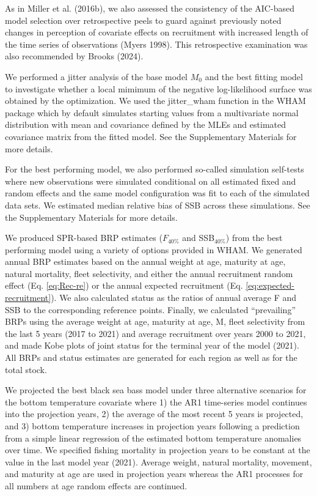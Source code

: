 \documentclass[
]{article}
\begin{document}
As in Miller et al. (2016b), we also assessed the consistency of the
AIC-based model selection over retrospective peels to guard against
previously noted changes in perception of covariate effects on
recruitment with increased length of the time series of observations
(Myers 1998). This retrospective examination was also recommended by
Brooks (2024).

We performed a jitter analysis of the base model \(M_0\) and the best
fitting model to investigate whether a local mimimum of the negative
log-likelihood surface was obtained by the optimization. We used the
jitter\_wham function in the WHAM package which by default simulates
starting values from a multivariate normal distribution with mean and
covariance defined by the MLEs and estimated covariance matrix from the
fitted model. See the Supplementary Materials for more details.

For the best performing model, we also performed so-called simulation
self-tests where new observations were simulated conditional on all
estimated fixed and random effects and the same model configuration was
fit to each of the simulated data sets. We estimated median relative
bias of SSB across these simulations. See the Supplementary Materials
for more details.

We produced SPR-based BRP estimates (\(F_{40\%}\) and SSB\(_{40\%}\))
from the best performing model using a variety of options provided in
WHAM. We generated annual BRP estimates based on the annual weight at
age, maturity at age, natural mortality, fleet selectivity, and either
the annual recruitment random effect (Eq. \ref{eq:Rec-re}) or the annual
expected recruitment (Eq. \ref{eq:expected-recruitment}). We also
calculated status as the ratios of annual average F and SSB to the
corresponding reference points. Finally, we calculated ``prevailing''
BRPs using the average weight at age, maturity at age, M, fleet
selectivity from the last 5 years (2017 to 2021) and average recruitment
over years 2000 to 2021, and made Kobe plots of joint status for the
terminal year of the model (2021). All BRPs and status estimates are
generated for each region as well as for the total stock.

We projected the best black sea bass model under three alternative
scenarios for the bottom temperature covariate where 1) the AR1
time-series model continues into the projection years, 2) the average of
the most recent 5 years is projected, and 3) bottom temperature
increases in projection years following a prediction from a simple
linear regression of the estimated bottom temperature anomalies over
time. We specified fishing mortality in projection years to be constant
at the value in the last model year (2021). Average weight, natural
mortality, movement, and maturity at age are used in projection years
whereas the AR1 processes for all numbers at age random effects are
continued.
\end{document}
